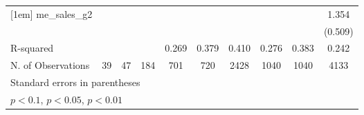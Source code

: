 {\begin{tabular}{l*{9}{c}}
[1em]
me\_sales\_g2 &                     &                     &                     &                     &                     &                     &                     &                     &       1.354\sym{**} \\
            &                     &                     &                     &                     &                     &                     &                     &                     &     (0.509)         \\
\hline
R-squared   &                     &                     &                     &       0.269         &       0.379         &       0.410         &       0.276         &       0.383         &       0.242         \\
N. of Observations &          39         &          47         &         184         &         701         &         720         &        2428         &        1040         &        1040         &        4133         \\
\hline\hline
\multicolumn{10}{l}{\footnotesize Standard errors in parentheses}\\
\multicolumn{10}{l}{\footnotesize \sym{*} \(p<0.1\), \sym{**} \(p<0.05\), \sym{***} \(p<0.01\)}\\
\end{tabular}
}
